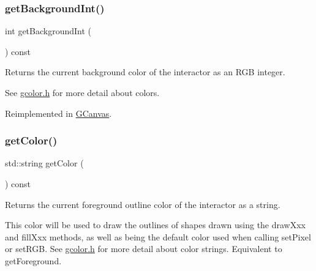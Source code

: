 \mbox{\label{classGDrawingSurface_a9e827257a55cb8cf4d9de2ec6bcfd7a0}} 
\subsubsection{\texorpdfstring{get\+Background\+Int()}{getBackgroundInt()}}
{\footnotesize\ttfamily int get\+Background\+Int (\begin{DoxyParamCaption}{ }\end{DoxyParamCaption}) const\hspace{0.3cm}{\ttfamily [virtual]}}



Returns the current background color of the interactor as an R\+GB integer. 

See \mbox{\hyperlink{gcolor_8h_source}{gcolor.\+h}} for more detail about colors. 

Reimplemented in \mbox{\hyperlink{classGCanvas_acd4f2b3b9619dacdfd71fc0004cac382}{G\+Canvas}}.

\mbox{\label{classGDrawingSurface_aa061dfa488c31e18549d64363c1d0e34}} 
\subsubsection{\texorpdfstring{get\+Color()}{getColor()}}
{\footnotesize\ttfamily std\+::string get\+Color (\begin{DoxyParamCaption}{ }\end{DoxyParamCaption}) const\hspace{0.3cm}{\ttfamily [virtual]}}



Returns the current foreground outline color of the interactor as a string. 

This color will be used to draw the outlines of shapes drawn using the draw\+Xxx and fill\+Xxx methods, as well as being the default color used when calling set\+Pixel or set\+R\+GB. See \mbox{\hyperlink{gcolor_8h_source}{gcolor.\+h}} for more detail about color strings. Equivalent to get\+Foreground. \mbox{\label{classGDrawingSurface_a9635c7af766cdc3417f346683fa0e6c1}} 
